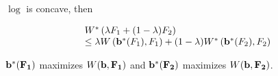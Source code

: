 $\log$ is concave, then

\[\begin{array}{l}
{W^*}\left( {\lambda {F_1} + (1 - \lambda ){F_2}} \right)\\
 \le \lambda W\left( {{{\bf{b}}^*}({F_1}),{F_1}} \right) + (1 - \lambda ){W^*}\left( {{{\bf{b}}^*}({F_2}),{F_2}} \right)
\end{array}\]

$\bf{b}^*(F_1)$ maximizes $W(\bf{b},F_1)$ and $\bf{b}^*(F_2)$ maximizes $W(\bf{b},F_2)$.

